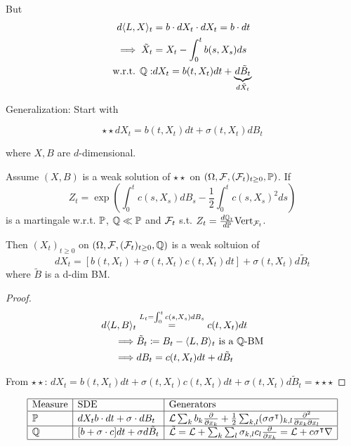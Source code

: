 But \begin{align*}
    d\langle L,X\rangle_t&=b\cdot dX_t\cdot dX_t=b\cdot dt\\
    \implies \tilde{X}_t &= X_t -\int_0^tb(s,X_s)ds\\
    \text{w.r.t. }\mathbb{Q}:& dX_t = b(t,X_t)dt+\underbrace{d\tilde{B}_t}_{d\tilde{X}_t}
\end{align*}

Generalization: Start with 

\[
\star\star dX_t = b(t,X_t)dt+\sigma(t,X_t)dB_t    
\]

where $X,B$ are $d$-dimensional.

\begin{proposition}\label{prop:2.2}
    Assume $(X,B)$ is a weak solution of $\star\star$ on $(\Omega,\mathcal{F},(\mathcal{F}_t)_{t\geq 0},\mathbb{P})$.
    If \[Z_t=\exp\left(\int_0^t c(s,X_s)dB_s-\frac{1}{2}\int_0^t c(s,X_s)^2ds\right)\]
    is a martingale 
    w.r.t. $\mathbb{P}$, $\mathbb{Q}\ll\mathbb{P}$ and $\mathcal{F}_t$ s.t. $Z_t=\frac{d\mathbb{Q}_t}{d\mathbb{P}}\text{Vert}_{\mathcal{F}_t}$.

    Then $(X_t)_{t\geq 0}$ on $(\Omega,\mathcal{F},(\mathcal{F}_t)_{t\geq 0},\mathbb{Q})$ is a weak soltuion of 
    \[dX_t = [b(t,X_t)+\sigma(t,X_t)c(t,X_t)dt]+\sigma(t,X_t)d\tilde{B}_t\]
    where $\tilde{B}$ is a d-dim BM.
\end{proposition}

\begin{proof}
    \begin{align*}
        d\langle L,B\rangle_t&\stackrel{L_t=\int_0^t c(s,X_s)dB_s}{=}c(t,X_t)dt\\
        \implies& \tilde{B}_t\coloneqq B_t-\langle L,B\rangle_t \text{ is a }\mathbb{Q} \text{-BM}\\
        \implies & dB_t = c(t,X_t)dt+d\tilde{B}_t
    \end{align*}

    From $\star\star$: $dX_t=b(t,X_t)dt+\sigma(t,X_t)c(t,X_t)dt+\sigma(t,X_t)d\tilde{B}_t=\star\star\star$
\end{proof}

\begin{equation*}%
    \begin{array}{|l|l|l|}\hline
        \text{Measure} & \text{SDE } & \text{Generators}\\
        \hline
        \bP& dX_t b\cdot dt +\sigma \cdot dB_t& \mathcal{L}\sum_k b_k\frac{\partial}{\partial x_k}+\frac{1}{2}\sum_{k,l}(\sigma\sigma^\intercal)_{k,l}\frac{\partial^2}{\partial x_k\partial x_l}\\
        \hline
        \Q&[b+\sigma\cdot c] dt+\sigma d\tilde{B}_t & \tilde{\cL}=\cL+\sum_{k}\sum_l \sigma_{k,l}c_l\frac{\partial}{\partial x_k}=\cL + c\sigma^\intercal \nabla\\
        \hline
    \end{array}
\end{equation*}

